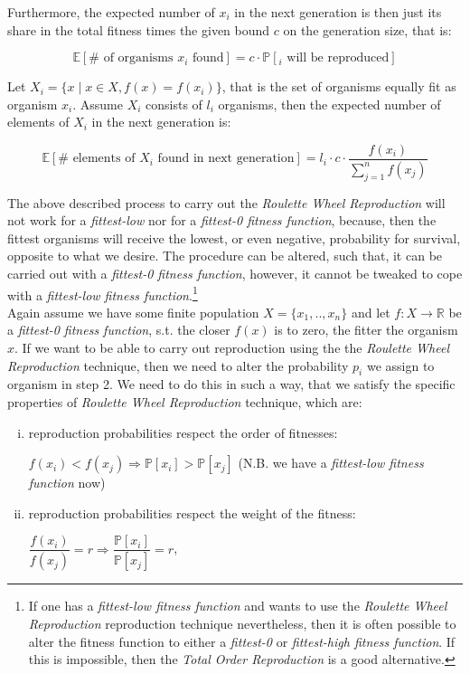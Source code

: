 \documentclass[a4paper]{article}
\newcommand{\Prob}[1]{\mathbb{P}[#1]}
\newcommand{\Expec}[1]{\mathbb{E}[#1]}
\theoremstyle{dotless}
\begin{document}
Furthermore, the expected number of $x_i$ in the next generation is then just its share in the total fitness times the given bound $c$ on the generation size, that is:

\begin{equation}
\Expec{\# \text{ of organisms $x_i$ found}} = c \cdot \Prob{_i \text{ will be reproduced}}
\end{equation}

Let $X_i = \{ x \mid x \in X, f(x)=f(x_i) \}$, that is the set of organisms equally fit as organism $x_i$. Assume $X_i$ consists of $l_i$ organisms, then the expected number of elements of $X_i$ in the next generation is:

\begin{equation}\label{expected number rwr}
\Expec{ \# \text{ elements of } X_i \text{ found in next generation}} = l_i \cdot c \cdot \dfrac{f(x_i)}{\sum^n_{j=1} f(x_j)}
\end{equation}

The above described process to carry out the \emph{Roulette Wheel Reproduction} will not work for a \emph{fittest-low} nor for a \emph{fittest-0 fitness function}, because, then the fittest organisms will receive the lowest, or even negative, probability for survival, opposite to what we desire. The procedure can be altered, such that, it can be carried out with a \emph{fittest-0 fitness function}, however, it cannot be tweaked to cope with a \emph{fittest-low fitness function}.\footnote{If one has a \emph{fittest-low fitness function} and wants to use the \emph{Roulette Wheel Reproduction} reproduction technique nevertheless, then it is often possible to alter the fitness function to either  a \emph{fittest-0} or \emph{fittest-high fitness function}. If this is impossible, then the \textit{Total Order Reproduction} is a good alternative.}\\

Again assume we have some finite population $X=\{x_1,..,x_n \}$ and let $f: X \rightarrow \mathbb{R}$ be a \emph{fittest-0 fitness function}, s.t. the closer $f(x)$ is to zero, the fitter the organism $x$. If we want to be able to carry out reproduction using the the \emph{Roulette Wheel Reproduction} technique, then we need to alter the probability $p_i$ we assign to organism in step 2. We need to do this in such a way, that we satisfy the specific properties of \emph{Roulette Wheel Reproduction} technique, which are:

	\begin{enumerate}[(i)]
	\item reproduction probabilities respect the order of fitnesses:
	\begin{center}
	$f(x_i) < f(x_j) \Rightarrow \Prob{x_i} > \Prob{x_j}$ (N.B. we have a \emph{fittest-low fitness function} now)
	\end{center}
	\item reproduction probabilities respect the weight of the fitness:
	\begin{center}
	$\dfrac{f(x_i)}{f(x_j)} = r \Rightarrow \dfrac{\Prob{x_i}}{\Prob{x_j}} = r$,
	\end{center}
	\end{enumerate}
\end{document}
